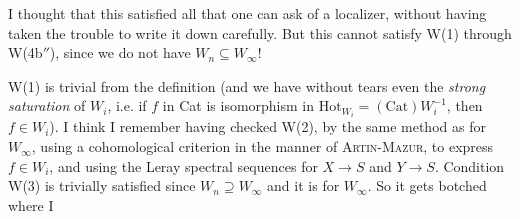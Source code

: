 I thought that this satisfied all that one can ask of a localizer, without having taken the trouble to write it down carefully. But this cannot satisfy W(1) through W(4b$''$), since we %
do not have $W_n \subseteq W_\infty$!

W(1) is trivial from the definition (and we have without tears even the \textit{strong saturation} of $W_i$, %
i.e. if $f$ in Cat is isomorphism in $\mathrm{Hot}_{W_i} = (\mathrm{Cat})W_i^{-1}$, then $f \in W_i$). I think I remember having checked W(2), by the same method as for $W_\infty$, using a cohomological criterion in the manner of \textsc{Artin-Mazur}, to express $f \in W_i$, and using the Leray spectral sequences for $X \longrightarrow S$ and $Y \longrightarrow S$. Condition W(3) is trivially satisfied since $W_n \supseteq W_\infty$ and it is for $W_\infty$. So it gets botched where I
